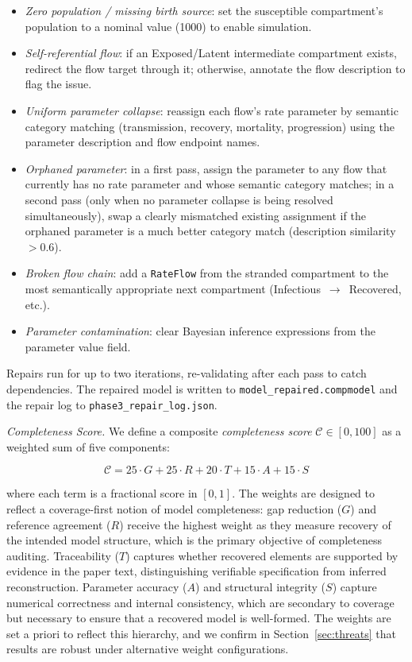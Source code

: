 \begin{itemize}[leftmargin=*]
  \item \textit{Zero population / missing birth source}: set the susceptible
        compartment's population to a nominal value (1000) to enable simulation.
  \item \textit{Self-referential flow}: if an Exposed/Latent intermediate compartment
        exists, redirect the flow target through it; otherwise, annotate the flow
        description to flag the issue.
  \item \textit{Uniform parameter collapse}: reassign each flow's rate parameter by
        semantic category matching (transmission, recovery, mortality, progression)
        using the parameter description and flow endpoint names.
  \item \textit{Orphaned parameter}: in a first pass, assign the parameter to any flow
        that currently has no rate parameter and whose semantic category matches; in a
        second pass (only when no parameter collapse is being resolved simultaneously),
        swap a clearly mismatched existing assignment if the orphaned parameter is a
        much better category match (description similarity $> 0.6$).
  \item \textit{Broken flow chain}: add a \texttt{RateFlow} from the stranded
        compartment to the most semantically appropriate next compartment
        (Infectious~$\to$~Recovered, etc.).
  \item \textit{Parameter contamination}: clear Bayesian inference expressions from
        the parameter value field.
\end{itemize}

Repairs run for up to two iterations, re-validating after each pass to catch
dependencies. The repaired model is written to \texttt{model\_repaired.compmodel} and
the repair log to \texttt{phase3\_repair\_log.json}.

\textit{Completeness Score.}
\label{sec:completeness}
We define a composite \emph{completeness score} $\mathcal{C} \in [0, 100]$ as a
weighted sum of five components:

\begin{equation}
  \mathcal{C} = 25 \cdot G + 25 \cdot R + 20 \cdot T + 15 \cdot A + 15 \cdot S
  \label{eq:completeness}
\end{equation}

\noindent where each term is a fractional score in $[0,1]$.
The weights are designed to reflect a coverage-first notion of model completeness:
gap reduction ($G$) and reference agreement ($R$) receive the highest weight as
they measure recovery of the intended model structure, which is the primary objective
of completeness auditing. Traceability ($T$) captures whether recovered elements are
supported by evidence in the paper text, distinguishing verifiable specification from
inferred reconstruction. Parameter accuracy ($A$) and structural integrity ($S$)
capture numerical correctness and internal consistency, which are secondary to
coverage but necessary to ensure that a recovered model is well-formed.
The weights are set a priori to reflect this hierarchy, and we confirm in
Section~\ref{sec:threats} that results are robust under alternative weight
configurations.

